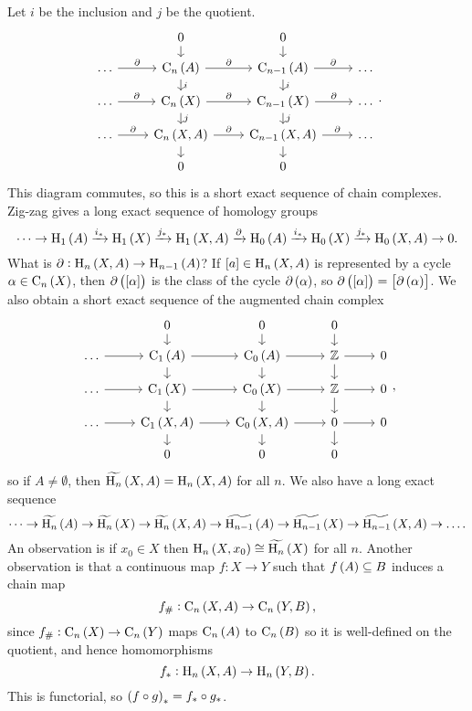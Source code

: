 Let $ i $ be the inclusion and $ j $ be the quotient.
$$
\begin{tikzcd}[row sep=small]
& 0 \arrow{d} & 0 \arrow{d} & \\
\dots \arrow{r}{\partial} & \C_n\br{A} \arrow{r}{\partial} \arrow{d}{i} & \C_{n - 1}\br{A} \arrow{r}{\partial} \arrow{d}{i} & \dots \\
\dots \arrow{r}{\partial} & \C_n\br{X} \arrow{r}{\partial} \arrow{d}{j} & \C_{n - 1}\br{X} \arrow{r}{\partial} \arrow{d}{j} & \dots \\
\dots \arrow{r}{\partial} & \C_n\br{X, A} \arrow{r}{\partial} \arrow{d} & \C_{n - 1}\br{X, A} \arrow{r}{\partial} \arrow{d} & \dots \\
& 0 & 0 &
\end{tikzcd}.
$$
This diagram commutes, so this is a short exact sequence of chain complexes. Zig-zag gives a long exact sequence of homology groups
$$ \dots \to \H_1\br{A} \xrightarrow{i_*} \H_1\br{X} \xrightarrow{j_*} \H_1\br{X, A} \xrightarrow{\partial} \H_0\br{A} \xrightarrow{i_*} \H_0\br{X} \xrightarrow{j_*} \H_0\br{X, A} \to 0. $$
What is $ \partial : \H_n\br{X, A} \to \H_{n - 1}\br{A} $? If $ \sbr{a} \in \H_n\br{X, A} $ is represented by a cycle $ \alpha \in \C_n\br{X} $, then $ \partial\br{\sbr{\alpha}} $ is the class of the cycle $ \partial\br{\alpha} $, so $ \partial\br{\sbr{\alpha}} = \sbr{\partial\br{\alpha}} $. We also obtain a short exact sequence of the augmented chain complex
$$
\begin{tikzcd}[row sep=small]
& 0 \arrow{d} & 0 \arrow{d} & 0 \arrow{d} & \\
\dots \arrow{r} & \C_1\br{A} \arrow{r} \arrow{d} & \C_0\br{A} \arrow{r} \arrow{d} & \ZZ \arrow{r} \arrow{d} & 0 \\
\dots \arrow{r} & \C_1\br{X} \arrow{r} \arrow{d} & \C_0\br{X} \arrow{r} \arrow{d} & \ZZ \arrow{r} \arrow{d} & 0 \\
\dots \arrow{r} & \C_1\br{X, A} \arrow{r} \arrow{d} & \C_0\br{X, A} \arrow{r} \arrow{d} & 0 \arrow{r} \arrow{d} & 0 \\
& 0 & 0 & 0 &
\end{tikzcd},
$$
so if $ A \ne \emptyset $, then $ \widetilde{\H_n}\br{X, A} = \H_n\br{X, A} $ for all $ n $. We also have a long exact sequence
$$ \dots \to \widetilde{\H_n}\br{A} \to \widetilde{\H_n}\br{X} \to \widetilde{\H_n}\br{X, A} \to \widetilde{\H_{n - 1}}\br{A} \to \widetilde{\H_{n - 1}}\br{X} \to \widetilde{\H_{n - 1}}\br{X, A} \to \dots. $$
An observation is if $ x_0 \in X $ then $ \H_n\br{X, x_0} \cong \widetilde{\H_n}\br{X} $ for all $ n $. Another observation is that a continuous map $ f : X \to Y $ such that $ f\br{A} \subseteq B $ induces a chain map
$$ f_\# : \C_n\br{X, A} \to \C_n\br{Y, B}, $$
since $ f_\# : \C_n\br{X} \to \C_n\br{Y} $ maps $ \C_n\br{A} $ to $ \C_n\br{B} $ so it is well-defined on the quotient, and hence homomorphisms
$$ f_* : \H_n\br{X, A} \to \H_n\br{Y, B}. $$
This is functorial, so $ \br{f \circ g}_* = f_* \circ g_* $.

